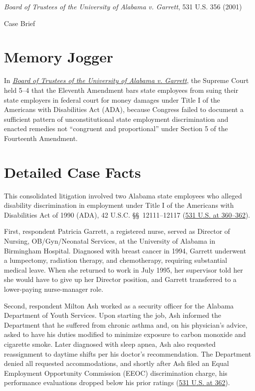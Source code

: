 \documentclass[12pt]{article}
\begin{document}
\begin{center}
{\LARGE \textit{Board of Trustees of the University of Alabama v. Garrett}, 531 U.S. 356 (2001)\par}
\vspace{0.8em}
{\large Case Brief\par}
\end{center}
\vspace{1em}

\section{Memory Jogger}

In \href{https://www.courtlistener.com/opinion/118407/board-of-trustees-of-univ-of-ala-v-garrett/}{\textit{Board of Trustees of the University of Alabama v. Garrett}}, the Supreme Court held 5--4 that the Eleventh Amendment bars state employees from suing their state employers in federal court for money damages under Title I of the Americans with Disabilities Act (ADA), because Congress failed to document a sufficient pattern of unconstitutional state employment discrimination and enacted remedies not ``congruent and proportional'' under Section 5 of the Fourteenth Amendment.

\section{Detailed Case Facts}

This consolidated litigation involved two Alabama state employees who alleged disability discrimination in employment under Title I of the Americans with Disabilities Act of 1990 (ADA), 42 U.S.C. \S\S~12111--12117 (\href{https://supreme.justia.com/cases/federal/us/531/356/}{531 U.S. at 360--362}).

First, respondent Patricia Garrett, a registered nurse, served as Director of Nursing, OB/Gyn/Neonatal Services, at the University of Alabama in Birmingham Hospital. Diagnosed with breast cancer in 1994, Garrett underwent a lumpectomy, radiation therapy, and chemotherapy, requiring substantial medical leave. When she returned to work in July 1995, her supervisor told her she would have to give up her Director position, and Garrett transferred to a lower-paying nurse-manager role.

Second, respondent Milton Ash worked as a security officer for the Alabama Department of Youth Services. Upon starting the job, Ash informed the Department that he suffered from chronic asthma and, on his physician's advice, asked to have his duties modified to minimize exposure to carbon monoxide and cigarette smoke. Later diagnosed with sleep apnea, Ash also requested reassignment to daytime shifts per his doctor's recommendation. The Department denied all requested accommodations, and shortly after Ash filed an Equal Employment Opportunity Commission (EEOC) discrimination charge, his performance evaluations dropped below his prior ratings (\href{https://tile.loc.gov/storage-services/service/ll/usrep/usrep531/usrep531356/usrep531356.pdf}{531 U.S. at 362}).
\end{document}
